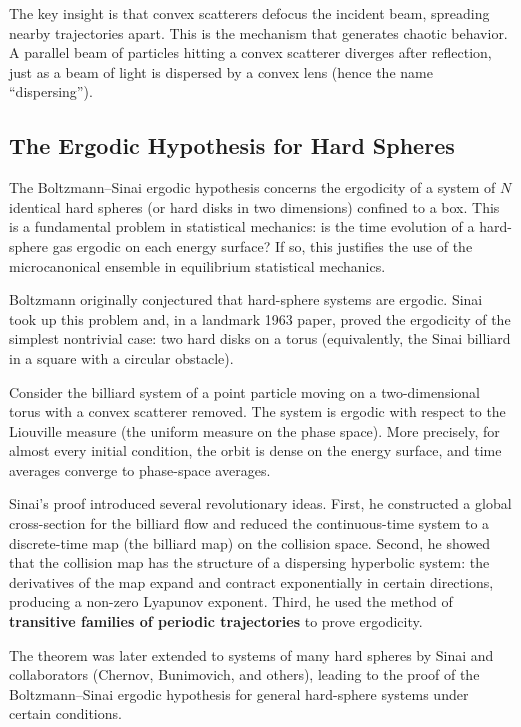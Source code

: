 The key insight is that convex scatterers defocus the incident beam, spreading nearby trajectories apart. This is the mechanism that generates chaotic behavior. A parallel beam of particles hitting a convex scatterer diverges after reflection, just as a beam of light is dispersed by a convex lens (hence the name ``dispersing'').

\subsection{The Ergodic Hypothesis for Hard Spheres}

The Boltzmann--Sinai ergodic hypothesis concerns the ergodicity of a system of \(N\) identical hard spheres (or hard disks in two dimensions) confined to a box. This is a fundamental problem in statistical mechanics: is the time evolution of a hard-sphere gas ergodic on each energy surface? If so, this justifies the use of the microcanonical ensemble in equilibrium statistical mechanics.

Boltzmann originally conjectured that hard-sphere systems are ergodic. Sinai took up this problem and, in a landmark 1963 paper, proved the ergodicity of the simplest nontrivial case: two hard disks on a torus (equivalently, the Sinai billiard in a square with a circular obstacle).

\begin{theorem}
Consider the billiard system of a point particle moving on a two-dimensional torus with a convex scatterer removed. The system is ergodic with respect to the Liouville measure (the uniform measure on the phase space). More precisely, for almost every initial condition, the orbit is dense on the energy surface, and time averages converge to phase-space averages.
\end{theorem}

Sinai's proof introduced several revolutionary ideas. First, he constructed a global cross-section for the billiard flow and reduced the continuous-time system to a discrete-time map (the billiard map) on the collision space. Second, he showed that the collision map has the structure of a dispersing hyperbolic system: the derivatives of the map expand and contract exponentially in certain directions, producing a non-zero Lyapunov exponent. Third, he used the method of \textbf{transitive families of periodic trajectories} to prove ergodicity.

The theorem was later extended to systems of many hard spheres by Sinai and collaborators (Chernov, Bunimovich, and others), leading to the proof of the Boltzmann--Sinai ergodic hypothesis for general hard-sphere systems under certain conditions.


